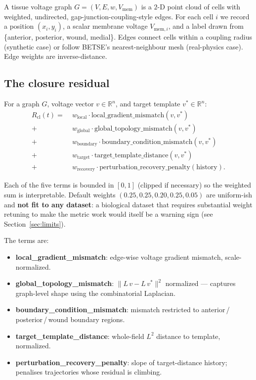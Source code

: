 \documentclass[11pt,a4paper]{article}
\begin{document}
A tissue voltage graph $G=(V,E,w,V_{\mathrm{mem}})$ is a $2$-D point cloud of cells with weighted, undirected, gap-junction-coupling-style edges. For each cell $i$ we record a position $(x_i,y_i)$, a scalar membrane voltage $V_{\mathrm{mem},i}$, and a label drawn from \{anterior, posterior, wound, medial\}. Edges connect cells within a coupling radius (synthetic case) or follow BETSE's nearest-neighbour mesh (real-physics case). Edge weights are inverse-distance.

\subsection{The closure residual}

For a graph $G$, voltage vector $v\in\mathbb{R}^n$, and target template $v^{*}\in\mathbb{R}^n$:
\begin{align*}
R_{\mathrm{cl}}(t) =\;&w_{\mathrm{local}}    \cdot \mathrm{local\_gradient\_mismatch}(v,v^*)\\
                +\;&w_{\mathrm{global}}   \cdot \mathrm{global\_topology\_mismatch}(v,v^*)\\
                +\;&w_{\mathrm{boundary}} \cdot \mathrm{boundary\_condition\_mismatch}(v,v^*)\\
                +\;&w_{\mathrm{target}}   \cdot \mathrm{target\_template\_distance}(v,v^*)\\
                +\;&w_{\mathrm{recovery}} \cdot \mathrm{perturbation\_recovery\_penalty}(\mathrm{history}).
\end{align*}

Each of the five terms is bounded in $[0,1]$ (clipped if necessary) so the weighted sum is interpretable. Default weights $(0.25, 0.25, 0.20, 0.25, 0.05)$ are uniform-ish and \textbf{not fit to any dataset}: a biological dataset that requires substantial weight retuning to make the metric work would itself be a warning sign (see Section~\ref{sec:limits}).

The terms are:
\begin{itemize}\itemsep0pt
\item \textbf{local\_gradient\_mismatch}: edge-wise voltage gradient mismatch, scale-normalized.
\item \textbf{global\_topology\_mismatch}: $\|L\,v - L\,v^{*}\|^{2}$ normalized --- captures graph-level shape using the combinatorial Laplacian.
\item \textbf{boundary\_condition\_mismatch}: mismatch restricted to anterior\,/\,posterior\,/\,wound boundary regions.
\item \textbf{target\_template\_distance}: whole-field $L^{2}$ distance to template, normalized.
\item \textbf{perturbation\_recovery\_penalty}: slope of target-distance history; penalises trajectories whose residual is climbing.
\end{itemize}
\end{document}

